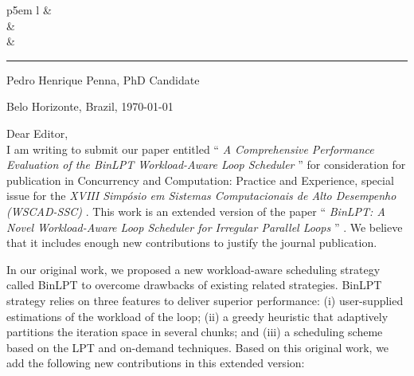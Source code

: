 \documentclass[a4paper,10pt,english]{article}
\def\firstname{Pedro Henrique\xspace}
\def\lastname{Penna\xspace}
\def\status{PhD Candidate\xspace}
\def\university{\pucminas}
\def\institute{\dcc}
\def\department{\ppginf}
\def\laboratory{\cart}
\def\city{Belo Horizonte, Brazil\xspace}
\def\prevarticle{%
	``\textit{%
		BinLPT: A Novel Workload-Aware Loop
		Scheduler for Irregular Parallel Loops%
	}''\xspace
}
\def\article{%
	``\textit{%
		A Comprehensive Performance Evaluation of
		the BinLPT Workload-Aware Loop Scheduler%
	}''\xspace
}
\def\journal{Concurrency and Computation: Practice and Experience\xspace}
\def\conference{%
	\textit{
		XVIII Simpósio em Sistemas Computacionais de Alto Desempenho (WSCAD-SSC)
	}\xspace
}
\begin{document}
\begin{tabular}{ p{5em} l }
		& {\large\bf{\university}} \\[0.2em]
		& \institute               \\
		& \department              \\[0.4em]
\end{tabular}

\rule{\linewidth}{0.5pt}



\begin{flushleft}
\firstname \lastname, \status\\
\laboratory
\end{flushleft}

\begin{flushright}
\city, \today
\end{flushright}

Dear Editor, \\

I am writing to submit our paper entitled \article for consideration for
publication in \journal, special issue for the \conference.  This work
is an extended version of the paper \prevarticle. We believe that it
includes enough new contributions to justify the journal publication.

In our original work, we proposed a new workload-aware scheduling strategy
called BinLPT to overcome drawbacks of existing related strategies. BinLPT
strategy relies on three features to deliver superior performance:  (i)
user-supplied estimations of the workload of the loop; (ii) a greedy heuristic
that adaptively partitions the iteration space in several chunks; and (iii) a
scheduling scheme based on the LPT and on-demand techniques.  Based on this
original work, we add the following new contributions in this extended version:
\end{document}
